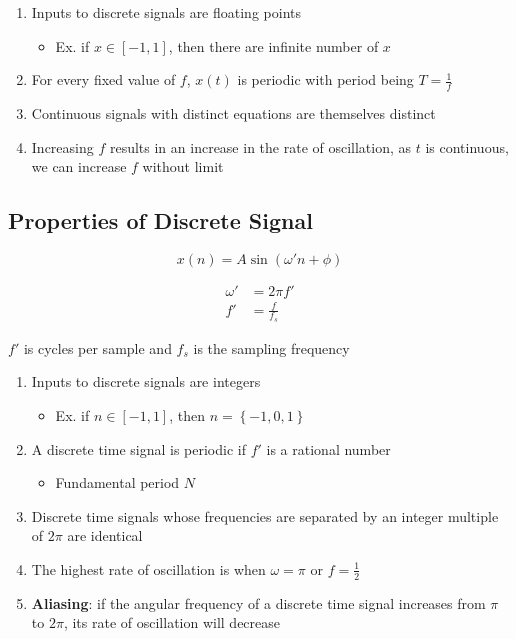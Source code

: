     \begin{enumerate}
      \item Inputs to discrete signals are floating points
      \begin{itemize}
        \item Ex. if $ x \in \left[-1, 1\right] $, then
        there are infinite number of $ x $
      \end{itemize}

      \item For every fixed value of $ f $, $ x\left( t \right) $ is periodic
      with period being $ T = \frac{1}{f} $
      \item Continuous signals with distinct equations are themselves distinct
      \item Increasing $ f $ results in an increase in the rate of oscillation,
      as $ t $ is continuous, we can increase $ f $ without limit
    \end{enumerate}

  \subsection{Properties of Discrete Signal}

    \begin{equation*}
      x\left( n \right) = A \sin\left( \omega' n + \phi \right)
    \end{equation*}

    \begin{align}
      \omega' &= 2\pi f' \\
      f' &= \frac{f}{f_{s}}
    \end{align}

    $ f' $ is cycles per sample and $ f_{s} $ is the sampling frequency

    \begin{enumerate}
      \item Inputs to discrete signals are integers
      \begin{itemize}
        \item Ex. if $ n \in \left[-1, 1\right] $, then
        $ n = \left\{ -1, 0, 1 \right\} $
      \end{itemize}

      \item A discrete time signal is periodic if $ f' $ is a rational number
      \begin{itemize}
        \item Fundamental period $ N $
      \end{itemize}

      \item Discrete time signals whose frequencies are separated by an
      integer multiple of $ 2 \pi $ are identical
      \item The highest rate of oscillation is when $ \omega = \pi $ or
      $ f = \frac{1}{2} $
      \item \textbf{Aliasing}: if the angular frequency of a discrete time
      signal increases from $ \pi $ to $ 2\pi $, its rate of oscillation
      will decrease
    \end{enumerate}

